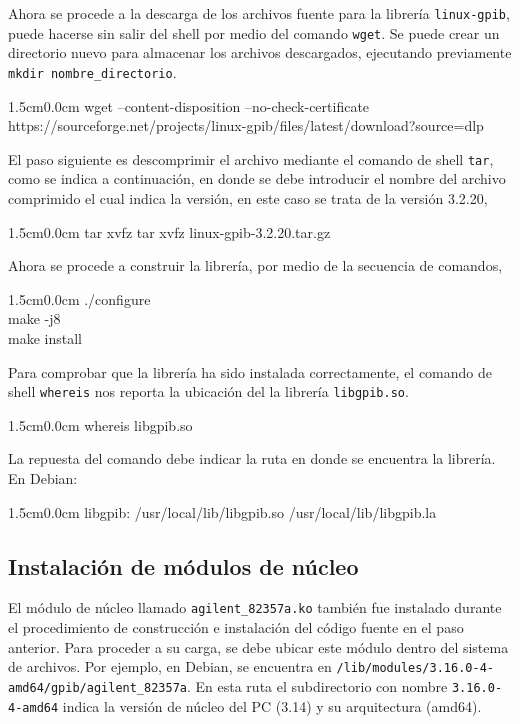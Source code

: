 \documentclass[paper=letter,oneside,fontsize=11pt, parskip=full]{scrartcl}
\newenvironment{code}
	{\begin{adjustwidth}{1.5cm}{0.0cm}\ttfamily}
	{\end{adjustwidth}}
\begin{document}
		Ahora se procede a la descarga de los archivos fuente para la librería \texttt{linux-gpib}, puede hacerse sin salir del shell por medio del comando \texttt{wget}. Se puede crear un directorio nuevo para almacenar los archivos descargados, ejecutando previamente \texttt{mkdir nombre\_directorio}.
		
		\begin{code}
			wget --content-disposition --no-check-certificate \\
			https://sourceforge.net/projects/linux-gpib/files/latest/download?source=dlp
		\end{code}
		
		El paso siguiente es descomprimir el archivo mediante el comando de shell \texttt{tar}, como se indica a continuación, en donde se debe introducir el nombre del archivo comprimido el cual indica la versión, en este caso se trata de la versión 3.2.20,

		\begin{code}		
			tar xvfz tar xvfz linux-gpib-3.2.20.tar.gz
		\end{code}
			
		Ahora se procede a construir la librería, por medio de la secuencia de comandos,
		
		\begin{code}		
			./configure \\		
			make -j8 	\\		
			make install
		\end{code}
					
		Para comprobar que la librería ha sido instalada correctamente, el comando de shell \texttt{whereis} nos reporta la ubicación del la librería \texttt{libgpib.so}.
		
		\begin{code}
			whereis libgpib.so
		\end{code}
		
		La repuesta del comando debe indicar la ruta en donde se encuentra la librería. En Debian:

		\begin{code}		
			libgpib: /usr/local/lib/libgpib.so /usr/local/lib/libgpib.la
		\end{code}
	
		\subsection{Instalación de módulos de núcleo}
		
		El módulo de núcleo llamado \texttt{agilent\_82357a.ko} también fue instalado durante el procedimiento de construcción e instalación del código fuente en el paso anterior. Para proceder a su carga, se debe ubicar este módulo dentro del sistema de archivos. Por ejemplo, en Debian, se encuentra en \texttt{/lib/modules/3.16.0-4-amd64/gpib/agilent\_82357a}. En esta ruta el subdirectorio con nombre \texttt{3.16.0-4-amd64} indica la versión de núcleo del PC (3.14) y su arquitectura (amd64). 
		
\end{document}
